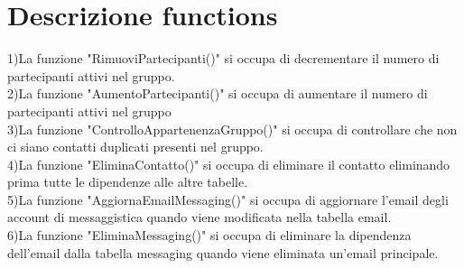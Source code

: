 \documentclass{article}
\begin{document}
    \section{\LARGE Descrizione functions}
    1)La funzione "RimuoviPartecipanti()" si occupa di decrementare il numero di partecipanti
    attivi nel gruppo.\\
    2)La funzione "AumentoPartecipanti()" si occupa di aumentare il numero di partecipanti
    attivi nel gruppo\\
    3)La funzione "ControlloAppartenenzaGruppo()" si occupa di controllare che non ci siano
    contatti duplicati presenti nel gruppo.\\
    4)La funzione "EliminaContatto()" si occupa di eliminare il contatto eliminando prima tutte 
    le dipendenze alle altre tabelle.\\
    5)La funzione "AggiornaEmailMessaging()" si occupa di aggiornare l'email degli account di messaggistica
    quando viene modificata nella tabella email.\\
    6)La funzione "EliminaMessaging()"  si occupa di eliminare la dipendenza dell'email dalla tabella
    messaging quando viene eliminata un'email principale. 
\end{document}
